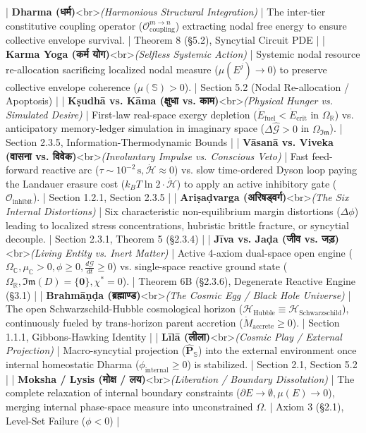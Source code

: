\documentclass[11pt,a4paper]{article}
\theoremstyle{definition}
\theoremstyle{remark}
\begin{document}
| \textbf{Dharma (धर्म)}<br>\textit{(Harmonious Structural Integration)} | The inter-tier constitutive coupling operator ($\mathcal{O}_{\text{coupling}}^{m \to n}$) extracting nodal free energy to ensure collective envelope survival. | Theorem 8 (§5.2), Syncytial Circuit PDE |
| \textbf{Karma Yoga (कर्म योग)}<br>\textit{(Selfless Systemic Action)} | Systemic nodal resource re-allocation sacrificing localized nodal measure ($\mu(E^j) \to 0$) to preserve collective envelope coherence ($\mu(\mathbb{S}) > 0$). | Section 5.2 (Nodal Re-allocation / Apoptosis) |
| \textbf{Kṣudhā vs. Kāma (क्षुधा vs. काम)}<br>\textit{(Physical Hunger vs. Simulated Desire)} | First-law real-space exergy depletion ($\dot{E}_{\text{fuel}} < \dot{E}_{\text{crit}}$ in $\Omega_{\mathbb{R}}$) vs. anticipatory memory-ledger simulation in imaginary space ($\Delta \hat{\mathcal{G}} > 0$ in $\Omega_{\mathfrak{Im}}$). | Section 2.3.5, Information-Thermodynamic Bounds |
| \textbf{Vāsanā vs. Viveka (वासना vs. विवेक)}<br>\textit{(Involuntary Impulse vs. Conscious Veto)} | Fast feed-forward reactive arc ($\tau \sim 10^{-2}\,\mathrm{s}, \dot{\mathcal{H}} \approx 0$) vs. slow time-ordered Dyson loop paying the Landauer erasure cost ($k_B T \ln 2 \cdot \dot{\mathcal{H}}$) to apply an active inhibitory gate ($\mathcal{O}_{\text{inhibit}}$). | Section 1.2.1, Section 2.3.5 |
| \textbf{Ariṣaḍvarga (अरिषड्वर्ग)}<br>\textit{(The Six Internal Distortions)} | Six characteristic non-equilibrium margin distortions ($\Delta \phi$) leading to localized stress concentrations, hubristic brittle fracture, or syncytial decouple. | Section 2.3.1, Theorem 5 (§2.3.4) |
| \textbf{Jīva vs. Jaḍa (जीव vs. जड़)}<br>\textit{(Living Entity vs. Inert Matter)} | Active 4-axiom dual-space open engine ($\Omega_{\mathbb{C}}, \mu_{\mathbb{C}} > 0, \phi \ge 0, \frac{d\mathcal{G}}{dt} \ge 0$) vs. single-space reactive ground state ($\Omega_{\mathbb{R}}, \mathfrak{Im}(D) = \{\mathbf{0}\}, \chi^* = 0$). | Theorem 6B (§2.3.6), Degenerate Reactive Engine (§3.1) |
| \textbf{Brahmāṇḍa (ब्रह्माण्ड)}<br>\textit{(The Cosmic Egg / Black Hole Universe)} | The open Schwarzschild-Hubble cosmological horizon ($\mathcal{H}_{\text{Hubble}} \equiv \mathcal{H}_{\text{Schwarzschild}}$), continuously fueled by trans-horizon parent accretion ($\dot{M}_{\text{accrete}} \ge 0$). | Section 1.1.1, Gibbons-Hawking Identity |
| \textbf{Līlā (लीला)}<br>\textit{(Cosmic Play / External Projection)} | Macro-syncytial projection ($\hat{\mathbf{P}}_{\mathbb{S}}$) into the external environment once internal homeostatic Dharma ($\phi_{\text{internal}} \ge 0$) is stabilized. | Section 2.1, Section 5.2 |
| \textbf{Moksha / Lysis (मोक्ष / लय)}<br>\textit{(Liberation / Boundary Dissolution)} | The complete relaxation of internal boundary constraints ($\partial E \to \emptyset, \mu(E) \to 0$), merging internal phase-space measure into unconstrained $\Omega$. | Axiom 3 (§2.1), Level-Set Failure ($\phi < 0$) |
\end{document}
